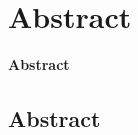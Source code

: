 \section{Abstract}
\begin{frame}[c]
	\begin{center}
		\LARGE \textbf{Abstract}
	\end{center}
\end{frame}
\subsection*{Abstract}
